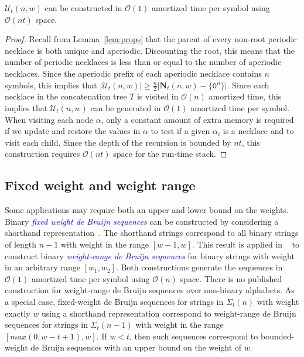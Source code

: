 \documentclass[US-letter,USenglish,authorcolumns,autoref]{lipics-v2021}
\renewcommand{\tt} {\mathtt}
\newcommand{\bN}{\mathbf{N}}
\newcommand{\defo}[1] {\emph{\textcolor{blue}{#1}}}
\begin{document}
\begin{theorem}
$\mathcal{U}_t(n,w)$ can be constructed in $\mathcal{O}(1)$ amortized time per symbol using $\mathcal{O}(nt)$ space.
\end{theorem}
%
\begin{proof}
Recall from Lemma~\ref{lem:props} that the parent of every non-root periodic necklace is both unique and aperiodic. Discounting the root, this means that the number of periodic necklaces is less than or equal to the number of aperiodic necklaces. Since the aperiodic prefix of each aperiodic necklace contains $n$ symbols, this implies that $|\mathcal{U}_t(n,w)| \geq \frac{n}{2}|\bN_t(n,w)-\{\tt{0}^n\}|$.  Since each necklace in the concatenation tree $T$ is visited in $\mathcal{O}(n)$ amortized time, this implies that $\mathcal{U}_t(n,w)$ can be generated in $\mathcal{O}(1)$ amortized time per symbol.  
%
When visiting each node $\alpha$, only a constant amount of extra memory is required if we update and restore the values in $\alpha$ to test if a given $\alpha_i$ is a necklace and to visit each child. Since the depth of the recursion is bounded by $nt$, this construction requires $\mathcal{O}(nt)$ space for the run-time stack.
\end{proof}





\subsection{Fixed weight and weight range}

Some applications may require both an upper and lower bound on the weights.
Binary \defo{fixed weight de Bruijn sequences} can be constructed by considering a shorthand representation~\cite{fixedweight2}. The shorthand strings correspond to all binary strings of length $n-1$ with weight in the range $[w-1,w]$.  This result is applied in ~\cite{dbrange} to construct 
binary \defo{weight-range de Bruijn sequences} for binary strings with weight in an arbitrary range $[w_1,w_2]$. Both constructions generate the sequences in $\mathcal{O}(1)$ amortized time per symbol using $\mathcal{O}(n)$ space.  There is no published construction for weight-range de Bruijn sequences over non-binary alphabets. As a special case, fixed-weight de Bruijn sequences for strings in $\Sigma_t(n)$ with weight exactly $w$ using a shorthand representation correspond to weight-range de Bruijn sequences for strings in $\Sigma_t(n-1)$ with weight in the range $[max(0,w-t+1), w]$.  If $w < t$, then such sequences correspond to bounded-weight de Bruijn sequences with an upper bound on the weight of $w$. 
\end{document}
